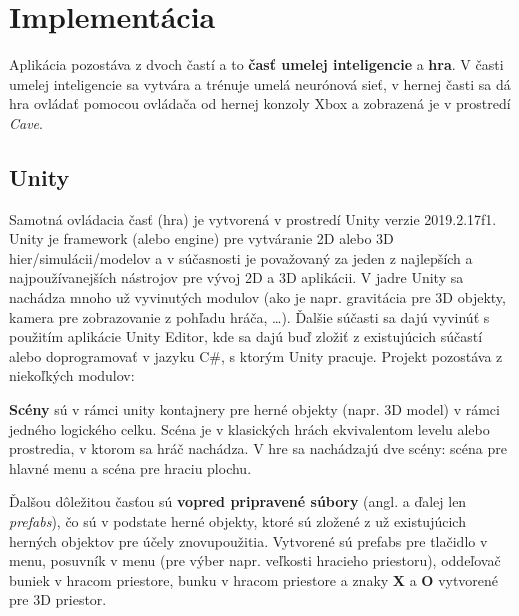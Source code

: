 \clearpage
\section{Implementácia}\label{sec:programming}

Aplikácia pozostáva z dvoch častí a to \textbf{časť umelej inteligencie} a \textbf{hra}.
V časti umelej inteligencie sa vytvára a trénuje umelá neurónová sieť, v hernej časti sa dá hra ovládať pomocou
ovládača od hernej konzoly Xbox a zobrazená je v prostredí \emph{Cave}.

\subsection{Unity}\label{subsec:unity}
Samotná ovládacia časť (hra) je vytvorená v prostredí Unity verzie 2019.2.17f1.
Unity je framework (alebo engine) pre vytváranie 2D alebo 3D hier/simulácii/modelov a v súčasnosti je považovaný za
jeden z najlepších a najpoužívanejších nástrojov pre vývoj 2D a 3D aplikácii.
V jadre Unity sa nachádza mnoho už vyvinutých modulov (ako je napr. gravitácia pre 3D objekty, kamera pre zobrazovanie
z pohľadu hráča, \dots).
Ďalšie súčasti sa dajú vyvinúť s použitím aplikácie Unity Editor, kde sa dajú buď zložiť z existujúcich súčastí
alebo doprogramovať v jazyku C\#, s ktorým Unity pracuje.
Projekt pozostáva z niekoľkých modulov:

\textbf{Scény} sú v rámci unity kontajnery pre herné objekty (napr. 3D model) v rámci jedného logického celku.
Scéna je v klasických hrách ekvivalentom levelu alebo prostredia, v ktorom sa hráč nachádza.
V hre sa nachádzajú dve scény: scéna pre hlavné menu a scéna pre hraciu plochu.

Ďalšou dôležitou časťou sú \textbf{vopred pripravené súbory} (angl. a ďalej len \emph{prefabs}), čo sú v podstate herné
objekty, ktoré sú zložené z už existujúcich herných objektov pre účely znovupoužitia.
Vytvorené sú prefabs pre tlačidlo v menu, posuvník v menu (pre výber napr. veľkosti hracieho priestoru), oddeľovač
buniek v hracom priestore, bunku v hracom priestore a znaky \textbf{X} a \textbf{O} vytvorené pre 3D priestor.

